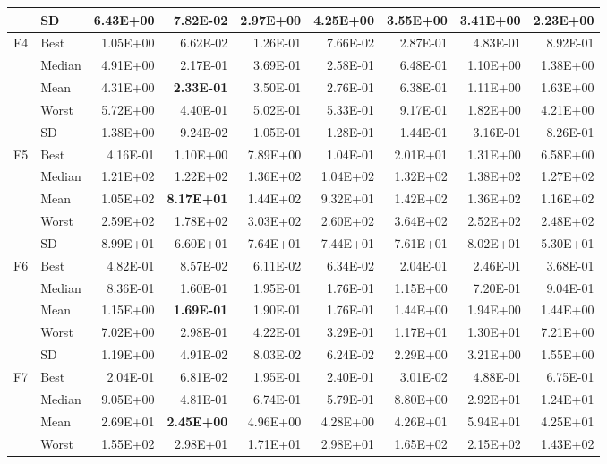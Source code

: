 \documentclass[10pt,a4paper]{article}
\newcommand{\bestval}[1]{\textbf{#1}}
\begin{document}
\begin{table}[p]
\begin{tabular}{llrrrrrrr}
 & SD & 6.43E+00 & 7.82E-02 & 2.97E+00 & 4.25E+00 & 3.55E+00 & 3.41E+00 & 2.23E+00 \\
\midrule
F4 & Best & 1.05E+00 & 6.62E-02 & 1.26E-01 & 7.66E-02 & 2.87E-01 & 4.83E-01 & 8.92E-01 \\
 & Median & 4.91E+00 & 2.17E-01 & 3.69E-01 & 2.58E-01 & 6.48E-01 & 1.10E+00 & 1.38E+00 \\
 & Mean & 4.31E+00 & \bestval{2.33E-01} & 3.50E-01 & 2.76E-01 & 6.38E-01 & 1.11E+00 & 1.63E+00 \\
 & Worst & 5.72E+00 & 4.40E-01 & 5.02E-01 & 5.33E-01 & 9.17E-01 & 1.82E+00 & 4.21E+00 \\
 & SD & 1.38E+00 & 9.24E-02 & 1.05E-01 & 1.28E-01 & 1.44E-01 & 3.16E-01 & 8.26E-01 \\
\midrule
F5 & Best & 4.16E-01 & 1.10E+00 & 7.89E+00 & 1.04E-01 & 2.01E+01 & 1.31E+00 & 6.58E+00 \\
 & Median & 1.21E+02 & 1.22E+02 & 1.36E+02 & 1.04E+02 & 1.32E+02 & 1.38E+02 & 1.27E+02 \\
 & Mean & 1.05E+02 & \bestval{8.17E+01} & 1.44E+02 & 9.32E+01 & 1.42E+02 & 1.36E+02 & 1.16E+02 \\
 & Worst & 2.59E+02 & 1.78E+02 & 3.03E+02 & 2.60E+02 & 3.64E+02 & 2.52E+02 & 2.48E+02 \\
 & SD & 8.99E+01 & 6.60E+01 & 7.64E+01 & 7.44E+01 & 7.61E+01 & 8.02E+01 & 5.30E+01 \\
\midrule
F6 & Best & 4.82E-01 & 8.57E-02 & 6.11E-02 & 6.34E-02 & 2.04E-01 & 2.46E-01 & 3.68E-01 \\
 & Median & 8.36E-01 & 1.60E-01 & 1.95E-01 & 1.76E-01 & 1.15E+00 & 7.20E-01 & 9.04E-01 \\
 & Mean & 1.15E+00 & \bestval{1.69E-01} & 1.90E-01 & 1.76E-01 & 1.44E+00 & 1.94E+00 & 1.44E+00 \\
 & Worst & 7.02E+00 & 2.98E-01 & 4.22E-01 & 3.29E-01 & 1.17E+01 & 1.30E+01 & 7.21E+00 \\
 & SD & 1.19E+00 & 4.91E-02 & 8.03E-02 & 6.24E-02 & 2.29E+00 & 3.21E+00 & 1.55E+00 \\
\midrule
F7 & Best & 2.04E-01 & 6.81E-02 & 1.95E-01 & 2.40E-01 & 3.01E-02 & 4.88E-01 & 6.75E-01 \\
 & Median & 9.05E+00 & 4.81E-01 & 6.74E-01 & 5.79E-01 & 8.80E+00 & 2.92E+01 & 1.24E+01 \\
 & Mean & 2.69E+01 & \bestval{2.45E+00} & 4.96E+00 & 4.28E+00 & 4.26E+01 & 5.94E+01 & 4.25E+01 \\
 & Worst & 1.55E+02 & 2.98E+01 & 1.71E+01 & 2.98E+01 & 1.65E+02 & 2.15E+02 & 1.43E+02 \\

\end{tabular}
\end{table}
\end{document}
